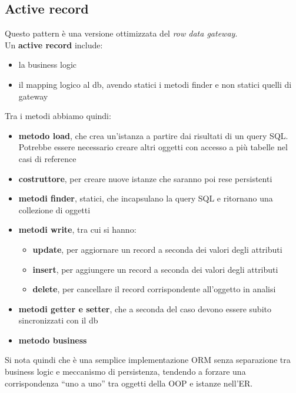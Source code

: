 \documentclass[a4paper,12pt, oneside]{book}
\begin{document}
\subsection{Active record}
Questo pattern è una versione ottimizzata del \textit{row data gateway}.\\
Un \textbf{active record} include:
\begin{itemize}
  \item la business logic
  \item il mapping logico al db, avendo statici i metodi finder e non statici
  quelli di gateway
\end{itemize}
Tra i metodi abbiamo quindi:
\begin{itemize}
  \item \textbf{metodo load}, che crea un'istanza a partire dai risultati di un
  query 
  SQL. Potrebbe essere necessario creare altri oggetti con accesso a più tabelle
  nel casi di reference
  \item \textbf{costruttore}, per creare nuove istanze che saranno poi rese
  persistenti 
  \item \textbf{metodi finder}, statici, che incapsulano la query SQL e
  ritornano una collezione di oggetti
  \item \textbf{metodi write}, tra cui si hanno:
  \begin{itemize}
    \item \textbf{update}, per aggiornare un record a seconda dei valori degli
    attributi 
    \item \textbf{insert}, per aggiungere un record a seconda dei valori degli
    attributi 
    \item \textbf{delete}, per cancellare il record corrispondente all'oggetto
    in analisi
  \end{itemize}
  \item \textbf{metodi getter e setter}, che a seconda del caso devono essere
  subito sincronizzati con il db
  \item \textbf{metodo business}
\end{itemize}
Si nota quindi che è una semplice implementazione ORM senza separazione tra
business logic e meccanismo di persistenza, tendendo a forzare una
corrispondenza ``uno a uno'' tra oggetti della OOP e istanze nell'ER.
\end{document}
